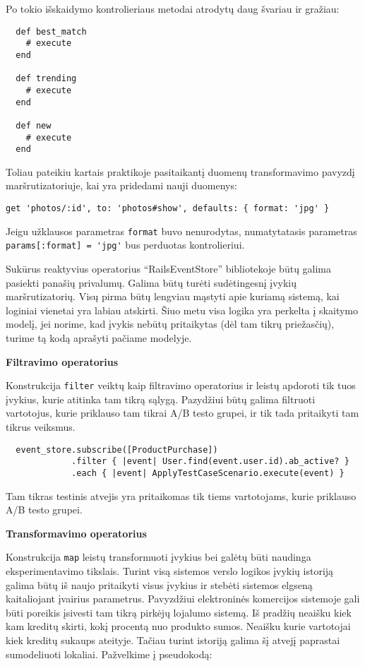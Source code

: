 Po tokio išskaidymo kontrolieriaus metodai atrodytų daug švariau ir gražiau:

\begin{lstlisting}
  def best_match
    # execute
  end

  def trending
    # execute
  end

  def new
    # execute
  end
\end{lstlisting}

Toliau pateikiu kartais praktikoje pasitaikantį duomenų transformavimo pavyzdį maršrutizatoriuje, kai yra pridedami nauji duomenys:

\begin{lstlisting}
get 'photos/:id', to: 'photos#show', defaults: { format: 'jpg' }
\end{lstlisting}

Jeigu užklausos parametras \lstinline|format| buvo nenurodytas, numatytatasis parametras \lstinline|params[:format] = 'jpg'| bus perduotas kontrolieriui.

Sukūrus reaktyvius operatorius ``RailsEventStore'' bibliotekoje būtų galima pasiekti panašių privalumų. Galima būtų turėti sudėtingesnį įvykių maršrutizatorių. Visų pirma būtų lengviau mąstyti apie kuriamą sistemą, kai loginiai vienetai yra labiau atskirti. Šiuo metu visa logika yra perkelta į skaitymo modelį, jei norime, kad įvykis nebūtų pritaikytas (dėl tam tikrų priežasčių), turime tą kodą aprašyti pačiame modelyje.

\textbf{Filtravimo operatorius}

Konstrukcija \lstinline|filter| veiktų kaip filtravimo operatorius ir leistų apdoroti tik tuos įvykius, kurie atitinka tam tikrą sąlygą. Pazydžiui būtų galima filtruoti vartotojus, kurie priklauso tam tikrai A/B testo grupei, ir tik tada pritaikyti tam tikrus veiksmus.

\begin{lstlisting}
  event_store.subscribe([ProductPurchase])
             .filter { |event| User.find(event.user.id).ab_active? }
             .each { |event| ApplyTestCaseScenario.execute(event) }
\end{lstlisting}

Tam tikras testinis atvejis yra pritaikomas tik tiems vartotojams, kurie priklauso A/B testo grupei.

\textbf{Transformavimo operatorius}

Konstrukcija \lstinline|map| leistų transformuoti įvykius bei galėtų būti naudinga eksperimentavimo tikslais. Turint visą sistemos verslo logikos įvykių istoriją galima būtų iš naujo pritaikyti visus įvykius ir stebėti sistemos elgseną kaitaliojant įvairius parametrus. Pavyzdžiui elektroninės komercijos sistemoje gali būti poreikis įsivesti tam tikrą pirkėjų lojalumo sistemą. Iš pradžių neaišku kiek kam kreditų skirti, kokį procentą nuo produkto sumos. Neaišku kurie vartotojai kiek kreditų sukaups ateityje. Tačiau turint istoriją galima šį atvejį paprastai sumodeliuoti lokaliai. Pažvelkime į pseudokodą:

